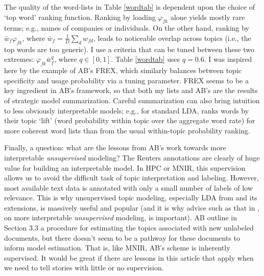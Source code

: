 \documentclass[12pt]{article}
\begin{document}
The quality of the word-lists in Table \ref{wordtab} is dependent upon the choice of `top word' ranking function.  Ranking by loading $\varphi_{fk}$ alone  yields mostly rare terms; e.g., names of companies or individuals.  On the other hand, ranking by ${\bar w}_f\varphi_{fk}$, where ${\bar w}_f = \tfrac{1}{D}\sum_d w_{fd}$, leads to noticeable overlap across topics (i.e., the top words are too generic).  I use a criteria that can be tuned between these two extremes: $\varphi_{fk}{\bar w}_f^q$, where $q \in [0,1]$.  Table \ref{wordtab} uses $q=0.6$. I was inspired here by the example of AB's FREX, which similarly balances between topic specificity and usage probability via a tuning parameter.  FREX seems to be a key ingredient in AB's framework, so that both my lists and AB's  are the results of  strategic model summarization.   Careful summarization can also bring intuition to less obviously interpretable models; e.g., for standard LDA, \cite{taddy_estimation_2012}  ranks words by their topic `lift' (word probability within topic over the aggregate word rate) for more coherent word lists than from the usual within-topic probability ranking.

Finally, a question: what are the lessons from AB's work
towards more interpretable {\it unsupervised} modeling? The Reuters
annotations are clearly of huge value for building an interpretable model.
In HPC or MNIR,  this supervision allows us to avoid the
difficult task of topic interpretation and labeling.  However, most available
text data is annotated with only a small number of labels of low relevance.
This is why unsupervised topic modeling, especially  LDA from
\cite{blei_latent_2003} and its extensions, is massively useful and popular (and it is why advice such as that in \citealt{wallach_rethinking_2009}, on more interpretable {\it unsupervised} modeling, is important). AB
outline in Section 3.3 a procedure for estimating the topics associated with
new  unlabeled documents, but there doesn't seem to be a pathway for these
documents to inform model estimation.  That is, like MNIR, AB's
scheme is inherently supervised.  It would be great if there are lessons in
this article that apply when we need to tell stories with little or no supervision.

\small


\end{document}
